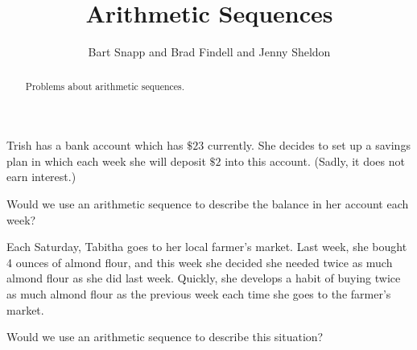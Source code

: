 \documentclass[nooutcomes]{ximera}
\title{Arithmetic Sequences}
\author{Bart Snapp and Brad Findell and Jenny Sheldon}
\begin{document}
\begin{abstract}
Problems about arithmetic sequences.
\end{abstract}
\maketitle




\begin{problem}
Trish has a bank account which has $\$23$ currently.  She decides to set up a savings plan in which each week she will deposit $\$2$ into this account. (Sadly, it does not earn interest.)

Would we use an arithmetic sequence to describe the balance in her account each week?
\begin{multipleChoice}
\end{multipleChoice}

\begin{problem}
Each Saturday, Tabitha goes to her local farmer's market.  Last week, she bought 4 ounces of almond flour, and this week she decided she needed twice as much almond flour as she did last week.  Quickly, she develops a habit of buying twice as much almond flour as the previous week each time she goes to the farmer's market.

Would we use an arithmetic sequence to describe this situation?
\begin{multipleChoice}
\end{multipleChoice}
\end{problem}
\end{problem}
\end{document}
